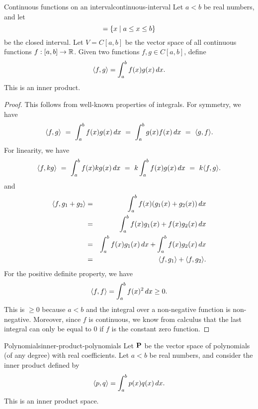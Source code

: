 \begin{example}{Continuous functions on an interval}{continuous-interval}
  Let $a<b$ be real numbers, and let
  \begin{equation*}
    [a,b] = \set{x \mid a \leq x \leq b}
  \end{equation*}
  be the closed interval. Let $V=C[a,b]$%
   be the vector space of all continuous
  functions%
  $f:[a,b]\to\mathbb{R}$. Given two functions $f,g\in C[a,b]$, define
  \begin{equation*}
    \langle f,g\rangle = \int_a^b f(x)g(x)\,dx.
  \end{equation*}
  This is an inner product.
\end{example}

\begin{proof}
  This follows from well-known properties of integrals. For symmetry,
  we have
  \begin{equation*}
    \langle f,g\rangle
    ~=~ \int_a^b f(x)g(x)\,dx
    ~=~ \int_a^b g(x)f(x)\,dx
    ~=~ \langle g,f\rangle.
  \end{equation*}
  For linearity, we have
  \begin{equation*}
    \langle f,kg\rangle
    ~=~ \int_a^b f(x)kg(x)\,dx
    ~=~ k\int_a^b f(x)g(x)\,dx
    ~=~ k\langle f,g\rangle.
  \end{equation*}
  and
  \begin{eqnarray*}
    \langle f,g_1+g_2\rangle
    &=& \int_a^b f(x)(g_1(x)+g_2(x))\,dx \\
    &=& \int_a^b f(x)g_1(x) + f(x)g_2(x)\,dx \\
    &=& \int_a^b f(x)g_1(x)\,dx + \int_a^b f(x)g_2(x)\,dx \\
    &=& \langle f,g_1\rangle + \langle f,g_2\rangle.
  \end{eqnarray*}
  For the positive definite property, we have
  \begin{equation*}
    \langle f,f\rangle
    = \int_a^b f(x)^2\,dx
    \geq 0.
  \end{equation*}
  This is $\geq 0$ because $a<b$ and the integral over a non-negative
  function is non-negative. Moreover, since $f$ is continuous, we know
  from calculus that the last integral can only be equal to $0$ if $f$
  is the constant zero function.
\end{proof}

\begin{example}{Polynomials}{inner-product-polynomials}
  Let $\mathbf{P}$ be the vector space of polynomials (of any degree) with
  real coefficients. Let $a<b$ be real numbers, and consider the inner
  product defined by
  \begin{equation*}
    \langle p,q\rangle = \int_a^b p(x)q(x)\,dx.
  \end{equation*}
  This is an inner product space.
\end{example}

